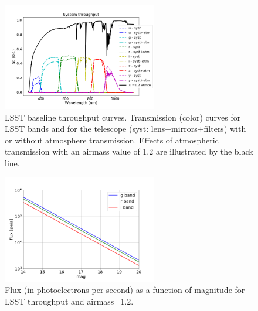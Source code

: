 \documentclass[\docopts]{\docclass}
\begin{document}
\begin{figure}[htbp]
\begin{center}
  \includegraphics[width=0.6\textwidth]{LSST_throughput.png}
  \caption{LSST baseline throughput curves. Transmission (color) curves for LSST bands and for the telescope (syst: lens+mirrors+filters) with or without atmosphere transmission.  Effects of atmospheric transmission with an airmass value of 1.2 are illustrated by the black line.}\label{fig:throughput}
\end{center}
\end{figure}

\begin{figure}[htbp]
\begin{center}
  \includegraphics[width=0.6\textwidth]{flux_mag.png}
 \caption{Flux (in photoelectrons per second) as a function of magnitude for LSST throughput and airmass=1.2.}\label{fig:fluxmag}
\end{center}
\end{figure}
\end{document}
